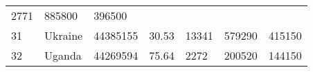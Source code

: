 \documentclass[
]{article}
\begin{document}
\begin{longtable}[]{@{}lllllll@{}}
\begin{minipage}[t]{0.09\columnwidth}
2771\strut
\end{minipage} & \begin{minipage}[t]{0.12\columnwidth}\raggedright
885800\strut
\end{minipage} & \begin{minipage}[t]{0.12\columnwidth}\raggedright
396500\strut
\end{minipage}\tabularnewline
\begin{minipage}[t]{0.06\columnwidth}\raggedright
31\strut
\end{minipage} & \begin{minipage}[t]{0.15\columnwidth}\raggedright
Ukraine\strut
\end{minipage} & \begin{minipage}[t]{0.13\columnwidth}\raggedright
44385155\strut
\end{minipage} & \begin{minipage}[t]{0.13\columnwidth}\raggedright
30.53\strut
\end{minipage} & \begin{minipage}[t]{0.09\columnwidth}\raggedright
13341\strut
\end{minipage} & \begin{minipage}[t]{0.12\columnwidth}\raggedright
579290\strut
\end{minipage} & \begin{minipage}[t]{0.12\columnwidth}\raggedright
415150\strut
\end{minipage}\tabularnewline
\begin{minipage}[t]{0.06\columnwidth}\raggedright
32\strut
\end{minipage} & \begin{minipage}[t]{0.15\columnwidth}\raggedright
Uganda\strut
\end{minipage} & \begin{minipage}[t]{0.13\columnwidth}\raggedright
44269594\strut
\end{minipage} & \begin{minipage}[t]{0.13\columnwidth}\raggedright
75.64\strut
\end{minipage} & \begin{minipage}[t]{0.09\columnwidth}\raggedright
2272\strut
\end{minipage} & \begin{minipage}[t]{0.12\columnwidth}\raggedright
200520\strut
\end{minipage} & \begin{minipage}[t]{0.12\columnwidth}\raggedright
144150\strut
\end{minipage}\tabularnewline

\end{longtable}
\end{document}

